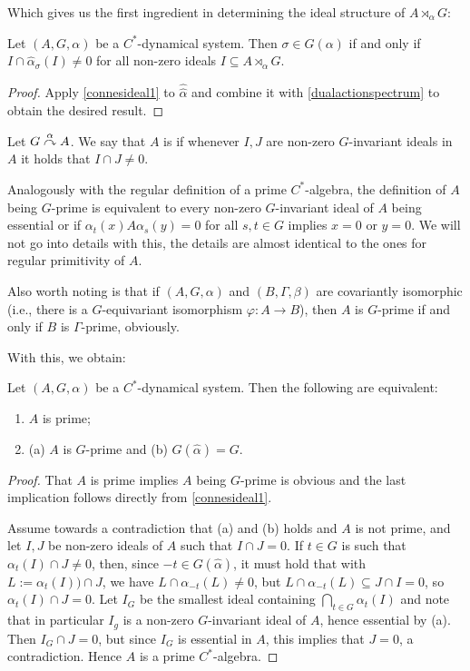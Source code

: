 Which gives us the first ingredient in determining the ideal structure of $A \rtimes_\alpha G$:
\begin{corollary}
	Let $(A,G,\alpha)$ be a $C^*$-dynamical system. Then $\sigma \in \hat G ( \alpha)$ if and only if $I \cap \hat \alpha_\sigma (I) \neq 0$ for all non-zero ideals $I \subseteq A \rtimes_\alpha G$.
	\label{olpe1.5.4}
\end{corollary}
\begin{proof}
	Apply \cref{connesideal1} to $\hat{ \hat{ \alpha}}$ and combine it with \cref{dualactionspectrum} to obtain the desired result.
\end{proof}
\begin{definition}
	 Let $G \stackrel{\alpha}{\curvearrowright} A$. We say that $A$ is  if whenever $I,J$ are non-zero $G$-invariant ideals in $A$ it holds that $I \cap J \neq 0$.
\end{definition}
\begin{remark}
	Analogously with the regular definition of a prime $C^*$-algebra, the definition of $A$ being $G$-prime is equivalent to every non-zero $G$-invariant ideal of $A$ being essential or if $\alpha_t(x) A \alpha_s(y)=0$ for all $s,t \in G$ implies $x = 0$ or $y = 0$. We will not go into details with this, the details are almost identical to the ones for regular primitivity of $A$.

	Also worth noting is that if $(A,G,\alpha)$ and $(B, \Gamma, \beta)$ are covariantly isomorphic (i.e., there is a $G$-equivariant isomorphism $\varphi \colon A \to B$), then $A$ is $G$-prime if and only if $B$ is $\Gamma$-prime, obviously.
\end{remark}
With this, we obtain:
\begin{lemma}
	Let $(A,G,\alpha)$ be a $C^*$-dynamical system. Then the following are equivalent:
	\begin{enumerate}
		\item $A$ is prime;
		\item (a) $A$ is $G$-prime and (b) $G(\hat \alpha ) =G$.
	\end{enumerate}
	\label{olpe1.3.4}
\end{lemma}
\begin{proof}
	That $A$ is prime implies $A$ being $G$-prime is obvious and the last implication follows directly from \cref{connesideal1}.

	Assume towards a contradiction that (a) and (b) holds and $A$ is not prime, and let $I, J$ be non-zero ideals of $A$ such that $I \cap J = 0$. If $t \in G$ is such that $\alpha_t(I) \cap J \neq 0$, then, since $-t \in G(\hat \alpha)$, it must hold that with $L := \alpha_t(I)) \cap J$, we have $L \cap \alpha_{-t}(L) \neq 0$, but $L \cap \alpha_{-t}(L) \subseteq  J \cap I = 0$, so $\alpha_t(I) \cap J = 0$. Let $I_G$ be the smallest ideal containing $\bigcap_{t \in G} \alpha_t(I)$ and note that in particular $I_g$ is a non-zero $G$-invariant ideal of $A$, hence essential by (a). Then $I_G \cap J = 0$, but since $I_G$ is essential in $A$, this implies that $J = 0$, a contradiction. Hence $A$ is a prime $C^*$-algebra.
\end{proof}
